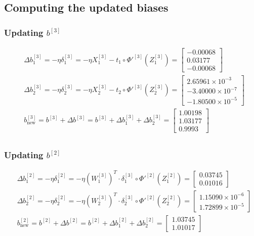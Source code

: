 \documentclass{article}
\begin{document}
\subsection*{Computing the updated biases}

\subsubsection*{Updating $b^{[3]}$}

\begin{align*}
    &\Delta b^{[3]}_1 = - \eta \delta^{[3]}_1 = - \eta X^{[3]}_1 - t_1 \circ \Phi'^{[3]}(Z^{[3]}_1) = \begin{bmatrix} -0.00068 \\   0.03177 \\  -0.00068\end{bmatrix}\\
    &\Delta b^{[3]}_2 = - \eta \delta^{[3]}_2 = - \eta X^{[3]}_2 - t_2 \circ \Phi'^{[3]}(Z^{[3]}_2) = \begin{bmatrix}  2.65961\times 10^{-3} \\  -3.40000\times 10^{-7} \\  -1.80500\times 10^{-5}\end{bmatrix} \\
    &b^{[3]}_{\text{new}} = b^{[3]} + \Delta b^{[3]} = b^{[3]} + \Delta b^{[3]}_1 + \Delta b^{[3]}_2 = \begin{bmatrix} 1.00198 \\  1.03177 \\  0.9993 \end{bmatrix} \\
\end{align*}

\subsubsection*{Updating $b^{[2]}$}

\begin{align*}
    &\Delta b^{[2]}_1 = - \eta \delta^{[2]}_1 = - \eta (W^{[3]}_1)^T \cdot \delta^{[3]}_1 \circ \Phi'^{[2]}(Z^{[2]}_1) = \begin{bmatrix} 0.03745 \\  0.01016\end{bmatrix} \\
    &\Delta b^{[2]}_2 = - \eta \delta^{[2]}_2 = - \eta (W^{[3]}_2)^T \cdot \delta^{[3]}_2 \circ \Phi'^{[2]}(Z^{[2]}_2) = \begin{bmatrix} 1.15090\times 10^{-6} \\  1.72899\times 10^{-5}\end{bmatrix} \\
    &b^{[2]}_{\text{new}} = b^{[2]} + \Delta b^{[2]} = b^{[2]} + \Delta b^{[2]}_1 + \Delta b^{[2]}_2 = \begin{bmatrix} 1.03745 \\  1.01017\end{bmatrix} \\
\end{align*}
\end{document}
